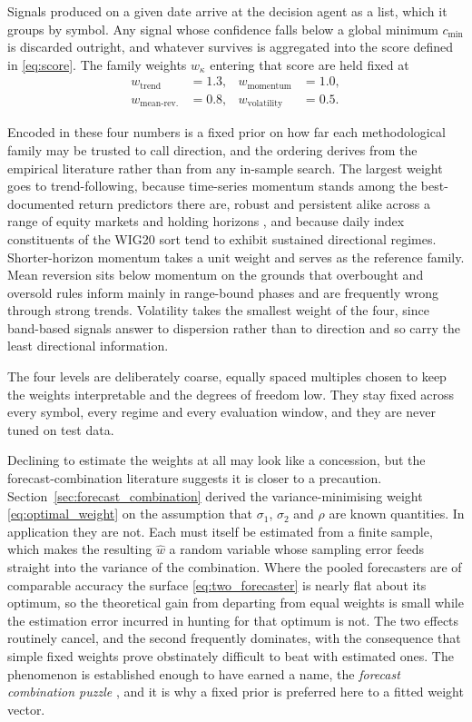Signals produced on a given date arrive at the decision agent as a list, which it groups by symbol. Any signal whose confidence falls below a global minimum $c_{\min}$ is discarded outright, and whatever survives is aggregated into the score defined in \eqref{eq:score}. The family weights $w_\kappa$ entering that score are held fixed at
\begin{equation}
\begin{aligned}
w_\mathrm{trend} &= 1.3, & w_\mathrm{momentum} &= 1.0, \\
w_\mathrm{mean\text{-}rev.} &= 0.8, & w_\mathrm{volatility} &= 0.5.
\end{aligned}
\label{eq:family_weights}
\end{equation}

Encoded in these four numbers is a fixed prior on how far each methodological family may be trusted to call direction, and the ordering derives from the empirical literature rather than from any in-sample search. The largest weight goes to trend-following, because time-series momentum stands among the best-documented return predictors there are, robust and persistent alike across a range of equity markets and holding horizons \cite{moskowitz2012,asness2013}, and because daily index constituents of the WIG20 sort tend to exhibit sustained directional regimes. Shorter-horizon momentum takes a unit weight and serves as the reference family. Mean reversion sits below momentum on the grounds that overbought and oversold rules inform mainly in range-bound phases and are frequently wrong through strong trends. Volatility takes the smallest weight of the four, since band-based signals answer to dispersion rather than to direction and so carry the least directional information.

The four levels are deliberately coarse, equally spaced multiples chosen to keep the weights interpretable and the degrees of freedom low. They stay fixed across every symbol, every regime and every evaluation window, and they are never tuned on test data.

Declining to estimate the weights at all may look like a concession, but the forecast-combination literature suggests it is closer to a precaution. Section~\ref{sec:forecast_combination} derived the variance-minimising weight \eqref{eq:optimal_weight} on the assumption that $\sigma_1$, $\sigma_2$ and $\rho$ are known quantities. In application they are not. Each must itself be estimated from a finite sample, which makes the resulting $\hat{w}$ a random variable whose sampling error feeds straight into the variance of the combination. Where the pooled forecasters are of comparable accuracy the surface \eqref{eq:two_forecaster} is nearly flat about its optimum, so the theoretical gain from departing from equal weights is small while the estimation error incurred in hunting for that optimum is not. The two effects routinely cancel, and the second frequently dominates, with the consequence that simple fixed weights prove obstinately difficult to beat with estimated ones. The phenomenon is established enough to have earned a name, the \emph{forecast combination puzzle} \cite{smithwallis2009,claeskens2016}, and it is why a fixed prior is preferred here to a fitted weight vector.

